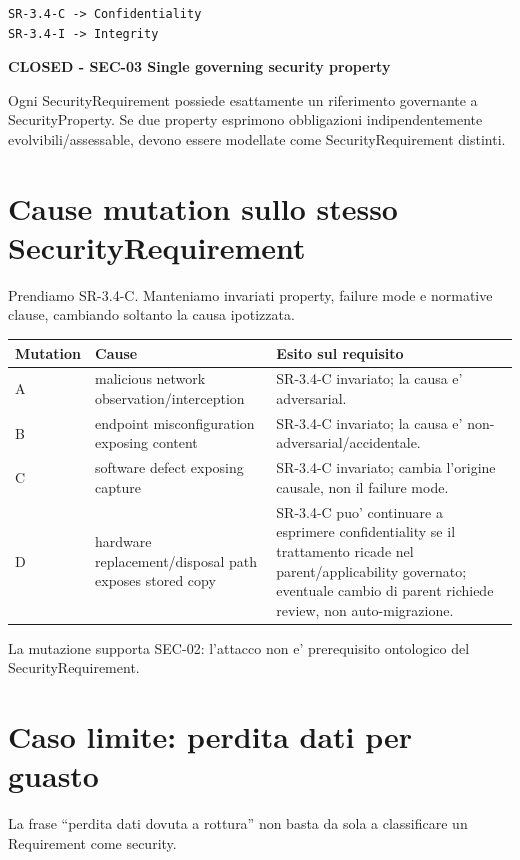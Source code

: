 \documentclass[11pt,a4paper]{article}
\newcommand{\closed}{\textbf{CLOSED}}
\newenvironment{resultbox}[1]{%
  \def\FrameCommand{\fcolorbox{ddtagreen}{ddtagray}}%
  \MakeFramed{\advance\hsize-2\width\FrameRestore}
  \noindent\textbf{#1}\par\smallskip
}{\endMakeFramed}
\begin{document}
\begin{lstlisting}
SR-3.4-C -> Confidentiality
SR-3.4-I -> Integrity
\end{lstlisting}

\begin{resultbox}{\closed{} - SEC-03 Single governing security property}
Ogni SecurityRequirement possiede esattamente un riferimento governante a SecurityProperty. Se due property esprimono obbligazioni indipendentemente evolvibili/assessable, devono essere modellate come SecurityRequirement distinti.
\end{resultbox}

\section{Cause mutation sullo stesso SecurityRequirement}

Prendiamo SR-3.4-C. Manteniamo invariati property, failure mode e normative clause, cambiando soltanto la causa ipotizzata.

\begin{longtable}{p{}p{}p{}}
\toprule
\textbf{Mutation} & \textbf{Cause} & \textbf{Esito sul requisito} \\
\midrule
\endhead
A & malicious network observation/interception & SR-3.4-C invariato; la causa e' adversarial. \\
\addlinespace
B & endpoint misconfiguration exposing content & SR-3.4-C invariato; la causa e' non-adversarial/accidentale. \\
\addlinespace
C & software defect exposing capture & SR-3.4-C invariato; cambia l'origine causale, non il failure mode. \\
\addlinespace
D & hardware replacement/disposal path exposes stored copy & SR-3.4-C puo' continuare a esprimere confidentiality se il trattamento ricade nel parent/applicability governato; eventuale cambio di parent richiede review, non auto-migrazione. \\
\bottomrule
\end{longtable}

La mutazione supporta SEC-02: l'attacco non e' prerequisito ontologico del SecurityRequirement.

\section{Caso limite: perdita dati per guasto}

La frase ``perdita dati dovuta a rottura'' non basta da sola a classificare un Requirement come security.
\end{document}
